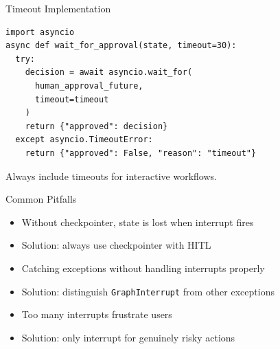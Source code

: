\documentclass[aspectratio=169,11pt]{beamer}
\begin{document}
\begin{frame}[fragile]{Timeout Implementation}
  \begin{codebox}
    \begin{lstlisting}
import asyncio
async def wait_for_approval(state, timeout=30):
  try:
    decision = await asyncio.wait_for(
      human_approval_future,
      timeout=timeout
    )
    return {"approved": decision}
  except asyncio.TimeoutError:
    return {"approved": False, "reason": "timeout"}
    \end{lstlisting}
  \end{codebox}
  \vspace{0.1cm}
  \begin{tipbox}
    Always include timeouts for interactive workflows.
  \end{tipbox}
\end{frame}

\begin{frame}{Common Pitfalls}
  \begin{warningbox}
    \setlength{\itemsep}{1pt}
    \begin{itemize}
      \item Without checkpointer, state is lost when interrupt fires
      \item Solution: always use checkpointer with HITL
    \end{itemize}
  \end{warningbox}
  \vspace{0.1cm}
  \begin{warningbox}
    \setlength{\itemsep}{1pt}
    \begin{itemize}
      \item Catching exceptions without handling interrupts properly
      \item Solution: distinguish \texttt{GraphInterrupt} from other exceptions
    \end{itemize}
  \end{warningbox}
  \vspace{0.1cm}
  \begin{warningbox}[Poor UX]
    \setlength{\itemsep}{1pt}
    \begin{itemize}
      \item Too many interrupts frustrate users
      \item Solution: only interrupt for genuinely risky actions
    \end{itemize}
  \end{warningbox}
\end{frame}
\end{document}
